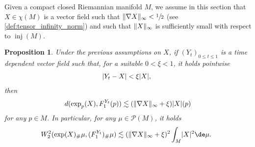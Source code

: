 \documentclass[10pt]{amsart}
\theoremstyle{plain}
\newtheorem{proposition}[proposition]{Proposition}
\theoremstyle{definition}
\numberwithin{equation}{section}
\newcommand{\prob}{\ensuremath{\mathcal{P}}}
\renewcommand{\comma}{\ensuremath{\text{, }}}
\newcommand{\comma}{\ensuremath{\text{, }}}
\newcommand{\fullstop}{\ensuremath{\text{. }}}
\DeclareMathOperator{\injradius}{inj}
\DeclarePairedDelimiter\abs{\lvert}{\rvert}
\DeclarePairedDelimiter\norm{\lVert}{\rVert}
\begin{document}
Given a compact closed Riemannian manifold $M$, we assume in this section that $X\in\chi(M)$ is a vector field such
that $\norm{\nabla X}_\infty<\sfrac12$ (see \cref{def:tensor_infinity_norm}) and such that
$\norm{X}_\infty$ is sufficiently small with respect to $\injradius(M)$.

\begin{proposition}\label{prop:stability_flow}
Under the previous assumptions on $X$,
if $(Y_t)_{0\le t\le 1}$ is a time dependent vector field such that, for a
suitable $0<\xi<1$, it holds pointwise
\begin{equation*}
\abs{Y_t-X} < \xi \abs{X}\comma
\end{equation*}
then
\begin{equation*}
d(\exp_p(X), F_1^{Y_t}(p)) \lesssim (\norm{\nabla X}_\infty + \xi)\abs{X}(p)
\end{equation*}
for any $p\in M$.
In particular, for any $\mu\in\prob(M)$, it holds
\begin{equation*}
W_2^2(\exp(X)_\#\mu, (F_1^{Y_t})_\#\mu)
\lesssim (\norm{\nabla X}_\infty+\xi)^2\int_M \abs{X}^2\de\mu \fullstop
\end{equation*}
\end{proposition}
\end{document}
